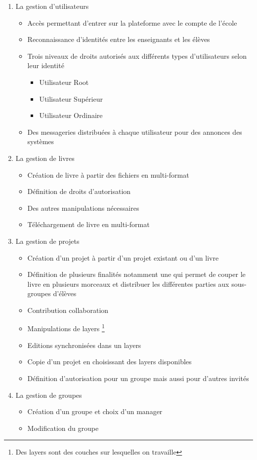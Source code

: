 \begin{enumerate}
    \item La gestion d'utilisateurs 
    \begin{itemize}
        \item Accès permettant d’entrer sur la plateforme avec le compte de l’école
        \item Reconnaissance d’identités entre les enseignants et les élèves
        \item Trois niveaux de droits autorisés aux différents types d’utilisateurs selon leur identité
            \begin{itemize}
                \item Utilisateur Root
                \item Utilisateur Supérieur
                \item Utilisateur Ordinaire
            \end{itemize}
        \item Des messageries distribuées à chaque utilisateur pour des annonces des systèmes
    \end{itemize}
    \item La gestion de livres
    \begin{itemize}
        \item Création de livre à partir des fichiers en multi-format
        \item Définition de droits d’autorisation 
        \item Des autres manipulations nécessaires
        \item Téléchargement de livre en multi-format 
    \end{itemize} 
    \item La gestion de projets
    \begin{itemize}
        \item Création d'un projet à partir d'un projet existant ou d'un livre
        \item Définition de plusieurs finalités notamment une qui permet de couper le livre en plusieurs morceaux et  distribuer les différentes parties aux sous-groupes d’élèves
        \item Contribution collaboration
        \item Manipulations de layers \footnote{Des layers sont des couches sur lesquelles on travaille}
        \item Editions synchronisées dans un layers
        \item Copie d'un projet en choisissant des layers disponibles
        \item Définition d'autorisation pour un groupe mais aussi pour d'autres invités
    \end{itemize}
    \item La gestion de groupes
    \begin{itemize}
        \item Création d'un groupe et choix d'un manager
        \item Modification du groupe
    \end{itemize}   
\end{enumerate}

